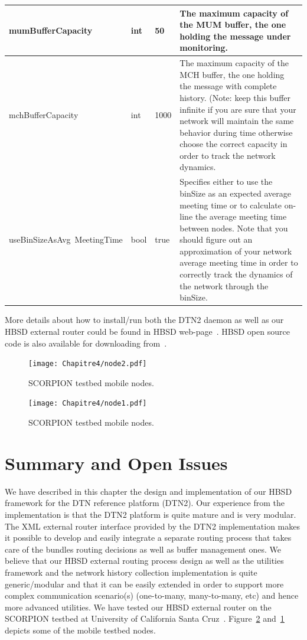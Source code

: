 \begin{longtable}[!h]{|p{4cm}|p{1cm}|p{2.2cm}|p{5cm}|}
\hline
mumBufferCapacity & int & 50& The maximum capacity of the MUM buffer, the one holding the message under monitoring. \\
\hline
mchBufferCapacity & int & 1000 & The maximum capacity of the MCH buffer, the one holding the message with complete history. 
(Note: keep this  buffer infinite if you are sure that your network will maintain the same behavior during time otherwise choose the correct capacity in order to track the network dynamics.\\
\hline
useBinSizeAsAvg\ MeetingTime & bool & true& Specifies either to use the binSize as an expected average meeting time or to calculate on-line the average meeting time between nodes. Note that you should figure out an approximation of your network average meeting time in order to correctly track the dynamics of the network  through the binSize.\\
\hline
\end{longtable}

More details about how to install/run both the DTN2 daemon as well as our HBSD external router could be found in HBSD web-page~\cite{HBSDDTN2}. HBSD open source code is also available for downloading from~\cite{HBSDDTN2}. 

\begin{figure}[!h]
  \begin{center}
    \texttt{[image: Chapitre4/node2.pdf]}
  \end{center}
  \caption{SCORPION testbed mobile nodes.}
  \label{SCORPION-nodes-1}
\end{figure}

\begin{figure}[!h]
  \begin{center}
    \texttt{[image: Chapitre4/node1.pdf]}
  \end{center}
  \caption{ SCORPION testbed mobile nodes.}
  \label{SCORPION-nodes-2}
\end{figure}

\section{Summary and Open Issues}

We have described in this chapter the design and implementation of our HBSD framework for the DTN reference platform (DTN2). Our experience from the implementation is that the DTN2 platform is quite mature and is very modular. The XML external router interface provided by the DTN2 implementation makes it possible to develop and easily integrate a separate routing process that takes care of the bundles routing decisions as well as buffer management ones. We believe that our HBSD external routing process design as well as the utilities framework and the network history collection implementation is quite generic/modular and that it can be easily extended in order to support more complex communication scenario(s) (one-to-many, many-to-many, etc) and hence more advanced utilities. We have tested our HBSD external router on the SCORPION testbed at University of California Santa Cruz~\cite{HBSDDTN2}. Figure~\ref{SCORPION-nodes-2} and~\ref{SCORPION-nodes-1} depicts some of the mobile testbed nodes.

